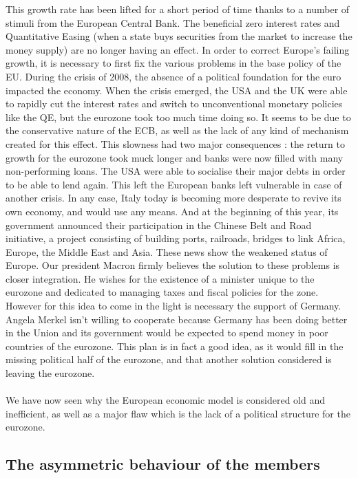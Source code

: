 \documentclass[12pt]{article}
\begin{document}
This growth rate has been lifted for a short period of time thanks to a number of stimuli from the European Central Bank. The beneficial zero interest rates and Quantitative Easing (when a state buys securities from the market to increase the money supply) are no longer having an effect. In order to correct Europe's failing growth, it is necessary to first fix the various problems in the base policy of the EU. During the crisis of 2008, the absence of a political foundation for the euro impacted the economy. When the crisis emerged, the USA and the UK were able to rapidly cut the interest rates and switch to unconventional monetary policies like the QE, but the eurozone took too much time doing so. It seems to be due to the conservative nature of the ECB, as well as the lack of any kind of mechanism created for this effect. This slowness had two major consequences : the return to growth for the eurozone took muck longer and banks were now filled with many non-performing loans. The USA were able to socialise their major debts in order to be able to lend again. This left the European banks left vulnerable in case of another crisis. In any case, Italy today is becoming more desperate to revive its own economy, and would use any means. And at the beginning of this year, its government announced their participation in the Chinese Belt and Road initiative, a project consisting of building ports, railroads, bridges to link Africa, Europe, the Middle East and Asia. These news show the weakened status of Europe. Our president Macron firmly believes the solution to these problems is closer integration. He wishes for the existence of a minister unique to the eurozone and dedicated to managing taxes and fiscal policies for the zone. However for this idea to come in the light is necessary the support of Germany. Angela Merkel isn't willing to cooperate because Germany has been doing better in the Union and its government would be expected to spend money in poor countries of the eurozone. This plan is in fact a good idea, as it would fill in the missing political half of the eurozone, and that another solution considered is leaving the eurozone. \\
\\
We have now seen why the European economic model is considered old and inefficient, as well as a major flaw which is the lack of a political structure for the eurozone. 

\subsection{The asymmetric behaviour of the members}
\end{document}
